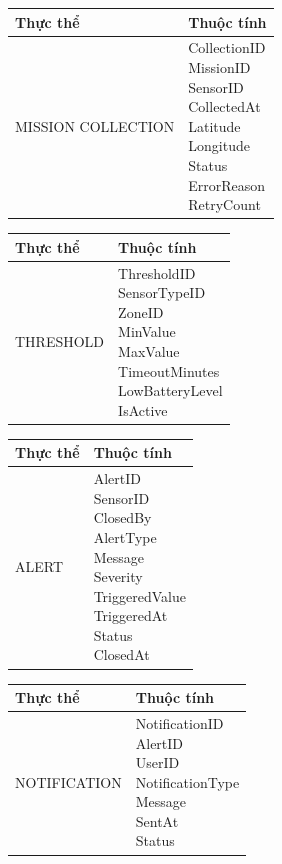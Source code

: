 \begin{longtable}{p{}p{}}
\toprule
\textbf{Thực thể} & \textbf{Thuộc tính} \\
\midrule 
MISSION COLLECTION & \makecell[l]{CollectionID \\MissionID \\SensorID \\CollectedAt \\Latitude \\Longitude \\Status \\ErrorReason \\RetryCount} \\
\bottomrule
\end{longtable}


\begin{longtable}{p{}p{}}
\toprule
\textbf{Thực thể} & \textbf{Thuộc tính} \\
\midrule
THRESHOLD & \makecell[l]{ThresholdID \\SensorTypeID \\ZoneID \\MinValue \\MaxValue \\TimeoutMinutes \\LowBatteryLevel \\IsActive} \\
\bottomrule
\end{longtable}


\begin{longtable}{p{}p{}}
\toprule
\textbf{Thực thể} & \textbf{Thuộc tính} \\
\midrule
ALERT & \makecell[l]{AlertID \\SensorID \\ClosedBy \\AlertType \\Message \\Severity \\TriggeredValue \\TriggeredAt \\Status \\ClosedAt} \\
\bottomrule
\end{longtable}


\begin{longtable}{p{}p{}}
\toprule
\textbf{Thực thể} & \textbf{Thuộc tính} \\
\midrule
NOTIFICATION & \makecell[l]{NotificationID \\AlertID \\UserID \\NotificationType \\Message \\SentAt \\Status} \\
\bottomrule
\end{longtable}

